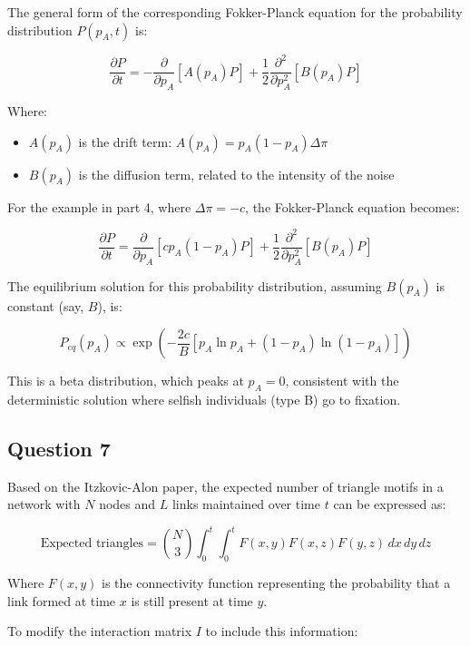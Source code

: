 \documentclass{article}
\begin{document}
The general form of the corresponding Fokker-Planck equation for the probability distribution \(P(p_A, t)\) is:

\[
\frac{\partial P}{\partial t} = -\frac{\partial}{\partial p_A}[A(p_A)P] + \frac{1}{2}\frac{\partial^2}{\partial p_A^2}[B(p_A)P]
\]

Where:
\begin{itemize}
\item \(A(p_A)\) is the drift term: \(A(p_A) = p_A(1-p_A)\Delta\pi\)
\item \(B(p_A)\) is the diffusion term, related to the intensity of the noise
\end{itemize}

For the example in part 4, where \(\Delta\pi = -c\), the Fokker-Planck equation becomes:

\[
\frac{\partial P}{\partial t} = \frac{\partial}{\partial p_A}[cp_A(1-p_A)P] + \frac{1}{2}\frac{\partial^2}{\partial p_A^2}[B(p_A)P]
\]

The equilibrium solution for this probability distribution, assuming \(B(p_A)\) is constant (say, \(B\)), is:

\[
P_{eq}(p_A) \propto \exp\left(-\frac{2c}{B}\left[p_A\ln p_A + (1-p_A)\ln(1-p_A)\right]\right)
\]

This is a beta distribution, which peaks at \(p_A = 0\), consistent with the deterministic solution where selfish individuals (type B) go to fixation.

\subsection{Question 7}

Based on the Itzkovic-Alon paper, the expected number of triangle motifs in a network with \(N\) nodes and \(L\) links maintained over time \(t\) can be expressed as:

\[
\text{Expected triangles} = \binom{N}{3} \int_0^t \int_0^t F(x,y) F(x,z) F(y,z) \, dx \, dy \, dz
\]

Where \(F(x,y)\) is the connectivity function representing the probability that a link formed at time \(x\) is still present at time \(y\).

To modify the interaction matrix \(I\) to include this information:
\end{document}
